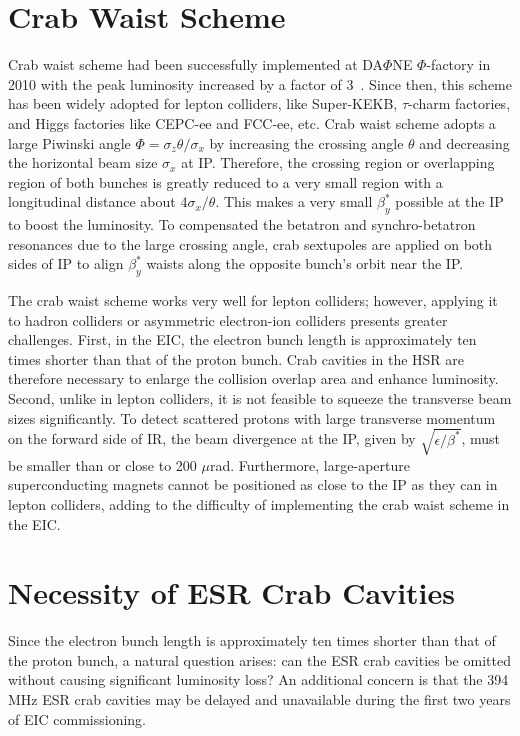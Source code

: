 \documentclass[letter,
keeplastbox,   %
]{jacow}
\begin{document}
\section{Crab Waist Scheme}

Crab waist scheme had been successfully implemented at DA$\Phi$NE $\Phi$-factory in 2010 with the peak luminosity increased by a factor of 3~\cite{crabwaist}.  Since then, this scheme  has been widely adopted for lepton colliders,  like Super-KEKB, $\tau$-charm factories, and Higgs factories like CEPC-ee and FCC-ee, etc.  Crab waist scheme adopts a large Piwinski angle $\Phi= \sigma_z \theta / \sigma_x $ by  increasing the crossing angle $\theta$  and decreasing the horizontal beam size $\sigma_x$ at IP.  Therefore,  the crossing region or overlapping region of both bunches is greatly reduced to a very small region with a longitudinal distance about $4 \sigma_x/ \theta$. This makes a very small $\beta^*_y$  possible at the IP to boost the luminosity. To compensated the betatron and synchro-betatron resonances due to the large crossing angle, crab sextupoles are applied on both sides of IP to align $\beta^*_y$ waists along the opposite bunch's orbit near the IP. 

The crab waist scheme works very well for lepton colliders; however, applying it to hadron colliders or asymmetric electron-ion colliders presents greater challenges. First, in the EIC, the electron bunch length is approximately ten times shorter than that of the proton bunch. Crab cavities in the HSR are therefore necessary to enlarge the collision overlap area and enhance luminosity. Second, unlike in lepton colliders, it is not feasible to squeeze the transverse beam sizes significantly. To detect scattered protons with large transverse momentum on the forward side of IR, the beam divergence at the IP, given by  $\sqrt{\epsilon/\beta^*}$, must be smaller than or close to 200 $\mu$rad. Furthermore, large-aperture superconducting magnets cannot be positioned as close to the IP as they can in lepton colliders, adding to the difficulty of implementing the crab waist scheme in the EIC.


\section{Necessity of ESR Crab Cavities}

Since the electron bunch length is approximately ten times shorter than that of the proton bunch, a natural question arises: can the ESR crab cavities be omitted without causing significant luminosity loss? An additional concern is that the 394 MHz ESR crab cavities may be delayed and unavailable during the first two years of EIC commissioning.
\end{document}
